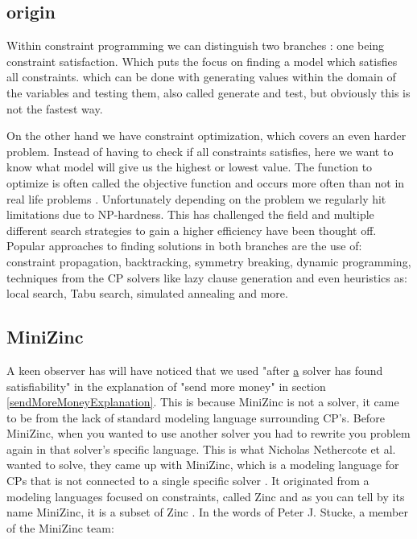 \subsection{origin}
Within constraint programming we can distinguish two branches \cite{52bartak1999constraint}: one being constraint satisfaction. Which puts the focus on finding a model which satisfies all constraints. which can be done with generating values within the domain of the variables and testing them, also called generate and test, but obviously this is not the fastest way. 

On the other hand we have constraint optimization, which covers an even harder problem. Instead of having to check if all constraints satisfies, here we want to know what model will give us the highest or lowest value. The function to optimize is often called the objective function and occurs more often than not in real life problems \cite{52bartak1999constraint}. 
Unfortunately depending on the problem we regularly hit limitations due to NP-hardness. This has challenged the field and multiple different search strategies to gain a higher efficiency have been thought off. Popular approaches to finding solutions in both branches are the use of: constraint propagation, backtracking, symmetry breaking, dynamic programming, techniques from the CP solvers like lazy clause generation and even heuristics as: local search, Tabu search, simulated annealing and more. 

\subsection{MiniZinc}
A keen observer has will have noticed that we used "after \underline{a} solver has found satisfiability" in the explanation of "send more money" in section \ref{sendMoreMoneyExplanation}. 
This is because MiniZinc is not a solver, it came to be from the lack of standard modeling language surrounding CP's. Before MiniZinc, when you wanted to use another solver you had to rewrite you problem again in that solver's specific language. This is what Nicholas Nethercote et al. wanted to solve, they came up with MiniZinc, which is a modeling language for CPs that is not connected to a single specific solver \cite{57nethercote2007minizinc}. It originated from a modeling languages focused on constraints, called Zinc \cite{68incbanda2006modelling} and as you can tell by its name MiniZinc, it is a subset of Zinc \cite{57nethercote2007minizinc}.
In the words of Peter J. Stucke, a member of the MiniZinc team: 

